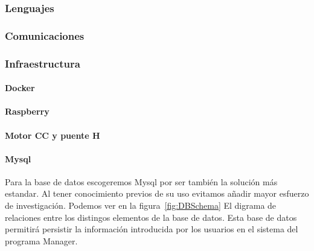 \subsubsection{Lenguajes}
    
\subsubsection{Comunicaciones}\label{subsubsec:communications}
    
\subsubsection{Infraestructura}\label{subsubsec:infraestructura}
\paragraph{Docker}\label{par:Docker}
    
\paragraph{Raspberry}
    
\paragraph{Motor CC y puente H}
    
    
\paragraph{Mysql}\label{par:mysql}
    Para la base de datos escogeremos Mysql por ser también la solución más estandar. Al tener conocimiento previos de su uso evitamos añadir mayor esfuerzo de investigación. Podemos ver en la figura~\cref{fig:DBSchema} El digrama de relaciones entre los distingos elementos de la base de datos. Esta base de datos permitirá persistir la información introducida por los usuarios en el sistema del programa Manager.\\

